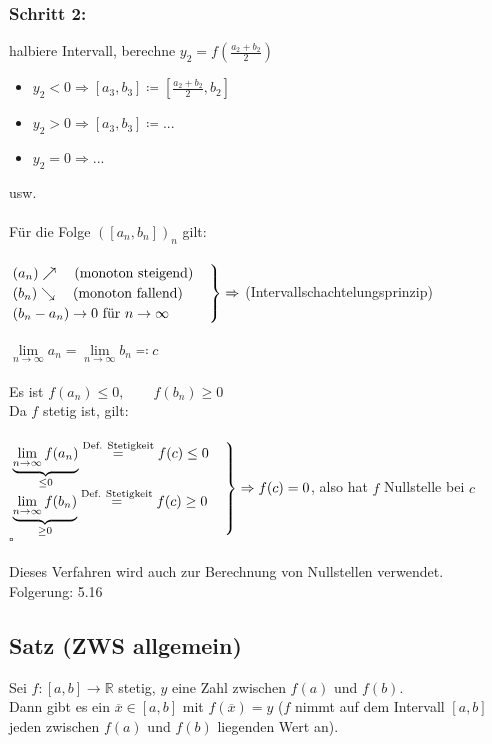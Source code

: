 \documentclass[12pt, titlepage]{article}
\newcommand{\R}{\mathds{R}}
\newcommand{\infn}{n\rightarrow\infty}
\renewenvironment{rcases}{%
	\left.\renewcommand*\lbrace.%
	\begin{cases}}%
	{\end{cases}\right\rbrace}
\renewcommand{\>}{\rightarrow}
\renewcommand{\*}{\cdot}
\begin{document}
	\subsubsection*{Schritt 2:}
	halbiere Intervall, berechne $y_2=f(\frac{a_2+b_2}{2})$
	\begin{itemize}
		\item $y_2<0\Rightarrow[a_3,b_3]\coloneqq[\frac{a_2+b_2}{2},b_2]$
		\item $y_2>0\Rightarrow[a_3,b_3]\coloneqq ...$
		\item $y_2=0\Rightarrow ...$
	\end{itemize}
	usw.\\
	\\
	Für die Folge $([a_n,b_n])_n$ gilt:\\
	\\
	$\begin{rcases}
	(a_n)\nearrow\quad\textrm{(monoton steigend)}\\
	(b_n)\searrow\quad\textrm{(monoton fallend)}\\
	(b_n-a_n)\>0\textrm{ für }\infn
	\end{rcases}\Rightarrow$ (Intervallschachtelungsprinzip)\\
	\\
	$\lim\limits_{\infn}a_n=\lim\limits_{\infn}b_n\eqqcolon c$\\
	\\
	Es ist $f(a_n)\leq0,\qquad f(b_n)\geq0$\\
	Da $f$ stetig ist, gilt:\\
	\\
	$\begin{rcases}
	\underbrace{\lim\limits_{\infn}f(a_n)}_{\leq0}\overset{\textrm{Def. Stetigkeit}}{=}f(c)\leq 0\\
	\underbrace{\lim\limits_{\infn}f(b_n)}_{\geq0}\overset{\textrm{Def. Stetigkeit}}{=}f(c)\geq0
	\end{rcases}\Rightarrow f(c)=0$, also hat $f$ Nullstelle bei $c$\\
	\hspace*{\fill}$\square$\\
	\\
	Dieses Verfahren wird auch zur Berechnung von Nullstellen verwendet.\\
	Folgerung: 5.16
	\subsection{Satz (ZWS allgemein)}
	Sei $f\colon[a,b]\>\R$ stetig, $y$ eine Zahl zwischen $f(a)$ und $f(b)$.\\
	Dann gibt es ein $\overline{x}\in[a,b]$ mit $f(\overline{x})=y$ ($f$ nimmt auf dem Intervall $[a,b]$ jeden zwischen $f(a)$ und $f(b)$ liegenden Wert an).\\
\end{document}

